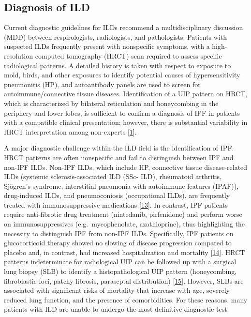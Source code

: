 \documentclass[
]{article}
\begin{document}
\hypertarget{diagnosis-of-ild}{%
\subsection{Diagnosis of ILD}\label{diagnosis-of-ild}}

Current diagnostic guidelines for ILDs recommend a multidisciplinary discussion (MDD) between respirologists, radiologists, and pathologists. Patients with suspected ILDs frequently present with nonspecific symptoms, with a high-resolution computed tomography (HRCT) scan required to assess specific radiological patterns. A detailed history is taken with respect to exposure to mold, birds, and other exposures to identify potential causes of hypersensitivity pneumonitis (HP), and autoantibody panels are used to screen for autoimmune/connective tissue diseases. Identification of a UIP pattern on HRCT, which is characterized by bilateral reticulation and honeycombing in the periphery and lower lobes, is sufficient to confirm a diagnosis of IPF in patients with a compatible clinical presentation; however, there is substantial variability in HRCT interpretation among non-experts {[}\protect\hyperlink{ref-raghu_diagnosis_2018}{1}{]}.

A major diagnostic challenge within the ILD field is the identification of IPF. HRCT patterns are often nonspecific and fail to distinguish between IPF and non-IPF ILDs. Non-IPF ILDs, which include HP, connective tissue disease-related ILDs (systemic sclerosis-associated ILD (SSc- ILD), rheumatoid arthritis, Sjögren's syndrome, interstitial pneumonia with autoimmune features (IPAF)), drug-induced ILDs, and pneumoconiosis (occupational ILDs), are frequently treated with immunosuppressive medications {[}\protect\hyperlink{ref-lederer_idiopathic_2018}{13}{]}. In contrast, IPF patients require anti-fibrotic drug treatment (nintedanib, pirfenidone) and perform worse on immunosuppressives (e.g.~mycophenolate, azathioprine), thus highlighting the necessity to distinguish IPF from non-IPF ILDs. Specifically, IPF patients on glucocorticoid therapy showed no slowing of disease progression compared to placebo and, in contrast, had increased hospitalization and mortality {[}\protect\hyperlink{ref-idiopathic_pulmonary_fibrosis_clinical_research_network_prednisone_2012}{14}{]}. HRCT patterns indeterminate for radiological UIP can be followed up with a surgical lung biopsy (SLB) to identify a histopathological UIP pattern (honeycombing, fibroblastic foci, patchy fibrosis, paraseptal distribution) {[}\protect\hyperlink{ref-lynch_diagnostic_2018}{15}{]}. However, SLBs are associated with significant risks of mortality that increase with age, severely reduced lung function, and the presence of comorbidities. For these reasons, many patients with ILD are unable to undergo the most definitive diagnostic test.
\end{document}
